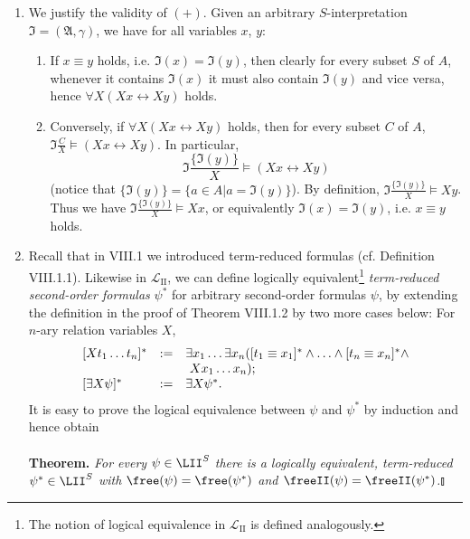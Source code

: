 \begin{enumerate}[1.]
\begin{enumerate}[(1)]
\item We justify the validity of $(+)$. Given an arbitrary $S$-interpretation $\mathfrak{I} = (\mathfrak{A}, \gamma)$, we have for all variables $x$, $y$:
\begin{enumerate}[1)]
\item If $x \equiv y$ holds, i.e. $\mathfrak{I}(x) = \mathfrak{I}(y)$, then clearly for every subset $S$ of $A$, whenever it contains $\mathfrak{I}(x)$ it must also contain $\mathfrak{I}(y)$ and vice versa, hence $\forall X (Xx \leftrightarrow Xy)$ holds.
\item Conversely, if $\forall X (Xx \leftrightarrow Xy)$ holds, then for every subset $C$ of $A$, $\mathfrak{I} \displaystyle\frac{C}{X} \models (Xx \leftrightarrow Xy)$. In particular,
\[
\mathfrak{I}\frac{\{ \mathfrak{I}(y) \}}{X} \models (Xx \leftrightarrow Xy)
\]
(notice that $\{ \mathfrak{I}(y) \} = \{ a \in A | a = \mathfrak{I}(y) \}$). By definition, $\mathfrak{I} \displaystyle\frac{\{ \mathfrak{I}(y) \}}{X} \models Xy$. Thus we have $\mathfrak{I} \displaystyle\frac{\{ \mathfrak{I}(y) \}}{X} \models Xx$, or equivalently $\mathfrak{I}(x) = \mathfrak{I}(y)$, i.e. $x \equiv y$ holds.
\end{enumerate}
\item Recall that in VIII.1 we introduced term-reduced formulas (cf. Definition VIII.1.1). Likewise in $\mathcal{L}_\mathrm{II}$, we can define logically equivalent\footnote{The notion of logical equivalence in $\mathcal{L}_\mathrm{II}$ is defined analogously.} \emph{term-reduced second-order formulas} $\psi^\ast$ for arbitrary second-order formulas $\psi$, by extending the definition in the proof of Theorem VIII.1.2 by two more cases below: For $n$-ary relation variables $X$,
\[
\begin{array}{lll}
[X t_1 \ldots t_n]^\ast & := & \exists x_1 \ldots \exists x_n ([t_1 \equiv x_1]^\ast \land \ldots \land [t_n \equiv x_n]^\ast \land \cr
\                       & \  & \ X x_1 \ldots x_n); \cr
[\exists X \psi]^\ast   & := & \exists X \psi^\ast.
\end{array}
\]
It is easy to prove the logical equivalence between $\psi$ and $\psi^\ast$ by induction and hence obtain\\
\ \\
\textbf{Theorem.} \emph{For every $\psi \in \LII^S$ there is a logically equivalent, term-reduced $\psi^\ast \in \LII^S$ with $\free(\psi) = \free(\psi^\ast)$ and $\freeII(\psi) = \freeII(\psi^\ast)$.}\nolinebreak\hfill$\talloblong$\\

\end{enumerate}
\end{enumerate}
